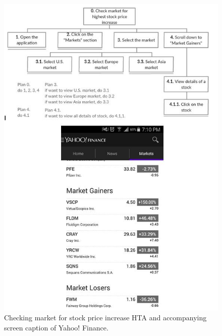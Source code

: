 \documentclass{sigchi}
\begin{document}
\begin{figure}
	\begin{center}
		\includegraphics[width=4.7in]{HTA_SC_2_Yahoo}
	\end{center}
	\caption{Checking market for stock price increase HTA and accompanying screen caption of Yahoo! Finance.}
	\label{fig:figure8}
\end{figure}



%
%
%
%
%
\balance

%
%
\end{document}

